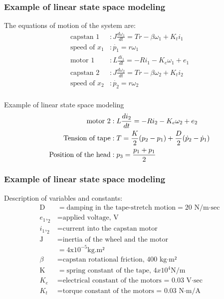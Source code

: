 \begin{frame}
	\frametitle{Example of linear state space modeling}
The equations of motion of the system are:
\vspace{-0.2cm}
\begin{align*}
 \text{capstan 1}&: J\frac{d\omega_1}{dt}=Tr-\beta \omega_1+{K_t}{i_1}\\
 \text{speed of }x_1&: \dot{p_1}=r\omega_1\\
 \text{motor 1}&: L\frac{di_1}{dt}=-R{i_1}-K_e \omega_1+e_1\\
 \text{capstan 2}&: J\frac{d\omega_2}{dt}=Tr-\beta \omega_2+{K_t}{i_2} \\ 
 \text{speed of }x_2&:\dot{p_2}=r\omega_2 \\
 \end{align*}
 \end{frame}
 \begin{frame}{Example of linear state space modeling}
 \begin{align*}
 \text{motor 2}&: L\frac{di_2}{dt}=-R{i_2}-K_e \omega_2+e_2 \\
\vspace{-1cm}
 \text{Tension of tape}&: T=\frac{K}{2}({p_2}-{p_1})+\frac{D}{2}({\dot{p}_2}-{\dot{p}_1}) \\
 \text{Position of the head}&: p_3=\frac{{p_1}+{p_1}}{2} \\
 \end{align*}
 \end{frame}


\begin{frame}
	\frametitle{Example of linear state space modeling}
Description of variables and constants:
\vspace{0.1cm}
\begin{align*}
\text{D}&=\text{damping in the tape-stretch motion}
= \text{20 N/m·sec}\\
{e_1,_2}&=\text{applied voltage, V }\\
{i_1,_2}&=\text{current into the capstan motor }\\
\text{J}&=\text{inertia of the wheel and the motor }\\
&= \text{4x}10^{-5}\text{kg.m²}\\
\beta &= \text{capstan rotational friction, 400 kg·m²}\\
\text{K}&=\text{spring constant of the tape, }4x{10^4}\text{N/m}\\
{K_e}&=\text{electrical constant of the motors = 0.03 V·sec }\\
{K_t}&=\text{torque constant of the motors = 0.03 N·m/A }\\
\end{align*}

\end{frame}

